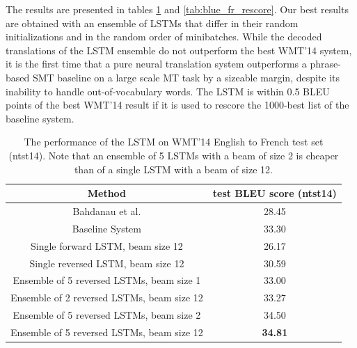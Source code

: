 
The results are presented in tables \ref{tab:blue_fr} and
\ref{tab:blue_fr_rescore}.  Our best results are obtained with an
ensemble of LSTMs that differ in their random initializations and
in the random order of minibatches.  While the decoded translations of the
LSTM ensemble do not outperform the best WMT'14 system, it is the first time
that a pure neural translation system outperforms a 
phrase-based SMT baseline on a large scale MT task by a sizeable margin,
despite its inability to handle out-of-vocabulary words.  The LSTM
is within 0.5 BLEU points of the best WMT'14 result if it is used to rescore the 1000-best
list of the baseline system.

\begin{table}[t]
\centering
\begin{small}
\begin{tabular}{|c|c|}
\hline
{\bf Method}  & {\bf test BLEU score (ntst14) } \\ \hline
Bahdanau et al. \cite{bog14}  &  28.45 \\ \hline
Baseline System  \cite{wmt14_en_fr} & 33.30 \\ \hline
\hline
Single forward LSTM, beam size 12 & 26.17 \\ \hline                 
Single reversed LSTM, beam size 12 & 30.59 \\ \hline
Ensemble of 5 reversed LSTMs, beam size 1  &  33.00 \\ \hline
Ensemble of 2 reversed LSTMs, beam size 12  &  33.27 \\ \hline
Ensemble of 5 reversed LSTMs, beam size 2  &  34.50 \\ \hline
Ensemble of 5 reversed LSTMs, beam size 12  &  {\bf 34.81} \\ \hline
\end{tabular}
\end{small}
\caption{The performance of the LSTM on WMT'14 English to French test
  set (ntst14).  Note that an ensemble of 5 LSTMs with a beam of size
  2 is cheaper than of a single LSTM with a beam of size 12.  }
\label{tab:blue_fr}
\end{table}


